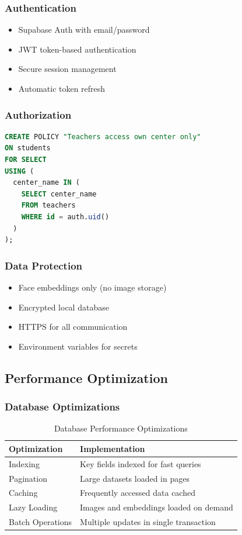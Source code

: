 \documentclass[12pt,a4paper]{article}
\begin{document}
\subsubsection{Authentication}
\begin{itemize}[leftmargin=*, itemsep=0.2em]
    \item Supabase Auth with email/password
    \item JWT token-based authentication
    \item Secure session management
    \item Automatic token refresh
\end{itemize}

\subsubsection{Authorization}
\begin{lstlisting}[language=SQL, caption=Row-Level Security Policy]
CREATE POLICY "Teachers access own center only"
ON students 
FOR SELECT 
USING (
  center_name IN (
    SELECT center_name 
    FROM teachers 
    WHERE id = auth.uid()
  )
);
\end{lstlisting}

\subsubsection{Data Protection}
\begin{itemize}[leftmargin=*, itemsep=0.2em]
    \item Face embeddings only (no image storage)
    \item Encrypted local database
    \item HTTPS for all communication
    \item Environment variables for secrets
\end{itemize}

\subsection{Performance Optimization}

\subsubsection{Database Optimizations}
\begin{table}[H]
\centering
\small
\begin{tabularx}{\textwidth}{|l|X|}
\hline
\rowcolor{lightgray}
\textbf{Optimization} & \textbf{Implementation} \\
\hline
Indexing & Key fields indexed for fast queries \\
\hline
Pagination & Large datasets loaded in pages \\
\hline
Caching & Frequently accessed data cached \\
\hline
Lazy Loading & Images and embeddings loaded on demand \\
\hline
Batch Operations & Multiple updates in single transaction \\
\hline
\end{tabularx}
\caption{Database Performance Optimizations}
\end{table}
\end{document}
